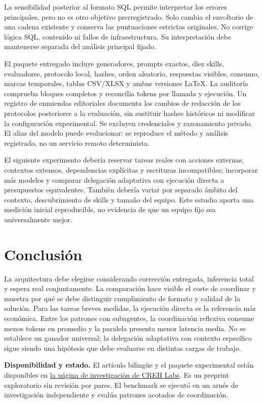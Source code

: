 La sensibilidad posterior al formato SQL permite interpretar los errores principales, pero no es otro objetivo prerregistrado. Solo cambia el envoltorio de una cadena existente y conserva las puntuaciones estrictas originales. No corrige lógica SQL, contenido ni fallos de infraestructura. Su interpretación debe mantenerse separada del análisis principal fijado.

El paquete entregado incluye generadores, prompts exactos, diez skills, evaluadores, protocolo local, hashes, orden aleatorio, respuestas visibles, consumo, marcas temporales, tablas CSV/XLSX y ambas versiones LaTeX. La auditoría comprueba bloques completos y reconcilia tokens por llamada y ejecución. Un registro de enmiendas editoriales documenta los cambios de redacción de los protocolos posteriores a la evaluación, sin sustituir hashes históricos ni modificar la configuración experimental. Se excluyen credenciales y razonamiento privado. El alias del modelo puede evolucionar: se reproduce el método y análisis registrado, no un servicio remoto determinista.

El siguiente experimento debería reservar tareas reales con acciones externas, contextos extensos, dependencias explícitas y escrituras incompatibles; incorporar más modelos y comparar delegación adaptativa con ejecución directa a presupuestos equivalentes. También debería variar por separado ámbito del contexto, descubrimiento de skills y tamaño del equipo. Este estudio aporta una medición inicial reproducible, no evidencia de que un equipo fijo sea universalmente mejor.

\section{Conclusión}
La arquitectura debe elegirse considerando corrección entregada, inferencia total y espera real conjuntamente. La comparación hace visible el coste de coordinar y muestra por qué se debe distinguir cumplimiento de formato y calidad de la solución. Para las tareas breves medidas, la ejecución directa es la referencia más económica. Entre los patrones con subagentes, la coordinación reflexiva consume menos tokens en promedio y la paralela presenta menor latencia media. No se establece un ganador universal; la delegación adaptativa con contexto específico sigue siendo una hipótesis que debe evaluarse en distintas cargas de trabajo.

\smallskip
\textbf{Disponibilidad y estado.} El artículo bilingüe y el paquete experimental están disponibles en \href{https://crehlabs.com/investigacion/subagentes-arquitecturas-tokens-tiempo-2026/}{la página de investigación de CREH Labs}. Es un preprint exploratorio sin revisión por pares. El benchmark se ejecutó en un arnés de investigación independiente y evalúa patrones acotados de coordinación.
